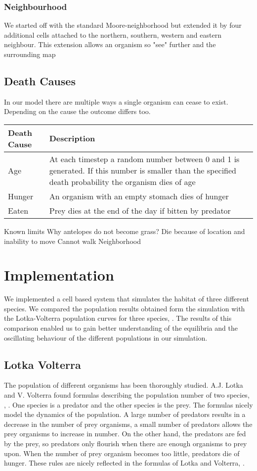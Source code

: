 \documentclass[11pt]{article}
\begin{document}
\subsubsection{Neighbourhood}
We started off with the standard Moore-neighborhood but extended it by four additional cells attached to the northern, southern, western and eastern neighbour. This extension allows an organism so "see" further and the surrounding map


\subsection{Death Causes}
In our model there are multiple ways a single organism can cease to exist. Depending on the cause the outcome differs too. 
\\
\begin{tabular}{l|p{11cm}}\label{tab:deathCauses}
Death Cause & Description \\ 
\hline 
\hline 
Age & At each timestep a random number between 0 and 1 is generated. If this number is smaller than the specified death probability the organism dies of age\\ 
\hline 
Hunger & An organism with an empty stomach dies of hunger \\ 
\hline 
Eaten & Prey dies at the end of the day if bitten by predator \\  
\end{tabular} 


Known limits
Why antelopes do not become grass?
Die because of location and inability to move
Cannot walk
Neighborhood

\section{Implementation}
We implemented a cell based system that simulates the habitat of three different species.
We compared the population results obtained form the simulation with the Lotka-Volterra population curves for three species, \cite{lotkaVolterraThreeSpecies}. The results of this comparison enabled us to gain better understanding of the equilibria and the oscillating behaviour of the different populations in our simulation.

\subsection{Lotka Volterra}
The population of different organisms has been thoroughly studied. A.J. Lotka and V. Volterra found formulas describing the population number of two species, \cite{lotka}, \cite{volterra}. One species is a predator and the other species is the prey. The formulas nicely model the dynamics of the population. A large number of predators results in a decrease in the number of prey organisms, a small number of predators allows the prey organisms to increase in number. On the other hand, the predators are fed by the prey, so predators only flourish when there are enough organisms to prey upon. When the number of prey organism becomes too little, predators die of hunger. These rules are nicely reflected in the formulas of Lotka and Volterra, \cite{lotkaVolterra}.\\
\end{document}
